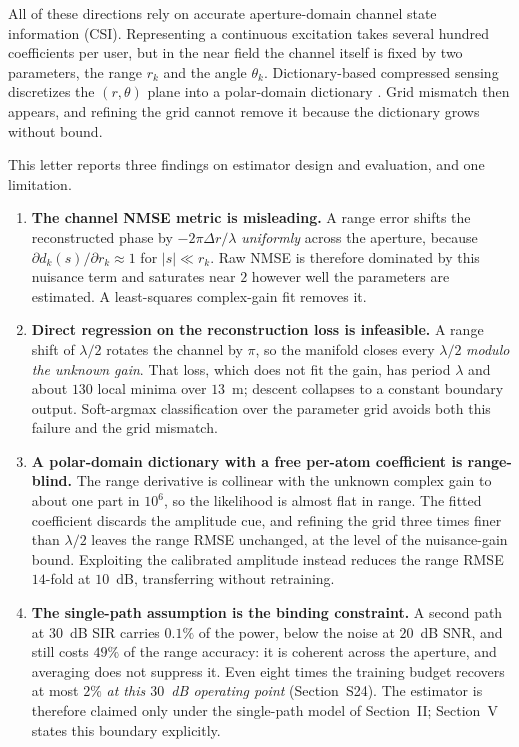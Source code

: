 \documentclass[journal]{IEEEtran}
\begin{document}
All of these directions rely on accurate aperture-domain channel state information (CSI). Representing a continuous excitation takes several hundred coefficients per user, but in the near field the channel itself is fixed by two parameters, the range $r_k$ and the angle $\theta_k$. Dictionary-based compressed sensing discretizes the $(r,\theta)$ plane into a polar-domain dictionary \cite{elaa,cuidai,weidai,omp,polar,sparse,extrap}. Grid mismatch then appears, and refining the grid cannot remove it because the dictionary grows without bound.

This letter reports three findings on estimator design and evaluation, and one limitation.


\begin{enumerate}
\setcounter{enumi}{0}
\setlength{\itemsep}{1pt plus 1pt minus 1pt}
\setlength{\parsep}{0pt}
\item \textbf{The channel NMSE metric is misleading.} A range error shifts the reconstructed phase by $-2\pi\Delta r/\lambda$ \emph{uniformly} across the aperture, because $\partial d_k(s)/\partial r_k \approx 1$ for $|s| \ll r_k$. Raw NMSE is therefore dominated by this nuisance term and saturates near $2$ however well the parameters are estimated. A least-squares complex-gain fit removes it.
\item \textbf{Direct regression on the reconstruction loss is infeasible.} A range shift of $\lambda/2$ rotates the channel by $\pi$, so the manifold closes every $\lambda/2$ \emph{modulo the unknown gain}. That loss, which does not fit the gain, has period $\lambda$ and about $130$ local minima over $13$~m; descent collapses to a constant boundary output. Soft-argmax classification over the parameter grid avoids both this failure and the grid mismatch.
\item \textbf{A polar-domain dictionary with a free per-atom coefficient is range-blind.} The range derivative is collinear with the unknown complex gain to about one part in $10^{6}$, so the likelihood is almost flat in range. The fitted coefficient discards the amplitude cue, and refining the grid three times finer than $\lambda/2$ leaves the range RMSE unchanged, at the level of the nuisance-gain bound. Exploiting the calibrated amplitude instead reduces the range RMSE $14$-fold at $10$~dB, transferring without retraining.
  \item \textbf{The single-path assumption is the binding constraint.} A second path at $30$~dB SIR carries $0.1\%$ of the power, below the noise at $20$~dB SNR, and still costs $49\%$ of the range accuracy: it is coherent across the aperture, and averaging does not suppress it. Even eight times the training budget recovers at most $2\%$ \emph{at this $30$~dB operating point} (Section~S24). The estimator is therefore claimed only under the single-path model of Section~II; Section~V states this boundary explicitly.
\end{enumerate}
\end{document}
